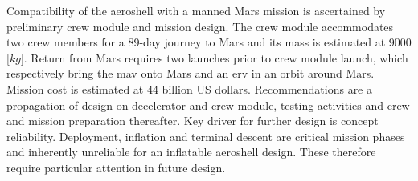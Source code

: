 \newline
Compatibility of the aeroshell with a manned Mars mission is ascertained by preliminary crew module and mission design. The crew module accommodates two crew members for a 89-day journey to Mars and its mass is estimated at 9000 [$kg$]. Return from Mars requires two launches prior to crew module launch, which respectively bring the \acrlong{mav} onto Mars and an \acrlong{erv} in an orbit around Mars. Mission cost is estimated at 44 billion US dollars.
\newline
\newline
Recommendations are a propagation of design on decelerator and crew module, testing activities and crew and mission preparation thereafter. Key driver for further design is concept reliability. Deployment, inflation and terminal descent are critical mission phases and inherently unreliable for an inflatable aeroshell design. These therefore require particular attention in future design.





